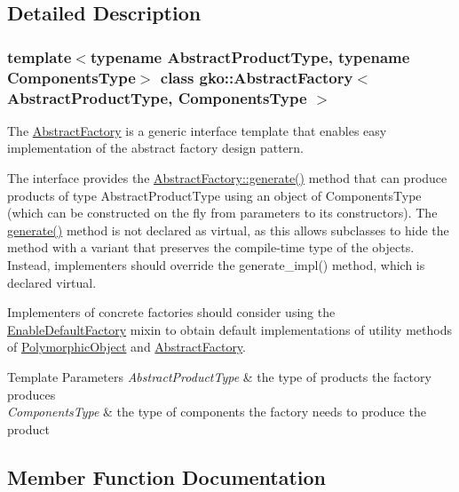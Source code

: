 \subsection{Detailed Description}
\subsubsection*{template$<$typename Abstract\+Product\+Type, typename Components\+Type$>$\newline
class gko\+::\+Abstract\+Factory$<$ Abstract\+Product\+Type, Components\+Type $>$}

The \hyperlink{classgko_1_1AbstractFactory}{Abstract\+Factory} is a generic interface template that enables easy implementation of the abstract factory design pattern. 

The interface provides the \hyperlink{classgko_1_1AbstractFactory_a159c45f1db78b6b928d69cb9adf5c9ee}{Abstract\+Factory\+::generate()} method that can produce products of type {\ttfamily Abstract\+Product\+Type} using an object of {\ttfamily Components\+Type} (which can be constructed on the fly from parameters to its constructors). The \hyperlink{classgko_1_1AbstractFactory_a159c45f1db78b6b928d69cb9adf5c9ee}{generate()} method is not declared as virtual, as this allows subclasses to hide the method with a variant that preserves the compile-\/time type of the objects. Instead, implementers should override the generate\+\_\+impl() method, which is declared virtual.

Implementers of concrete factories should consider using the \hyperlink{classgko_1_1EnableDefaultFactory}{Enable\+Default\+Factory} mixin to obtain default implementations of utility methods of \hyperlink{classgko_1_1PolymorphicObject}{Polymorphic\+Object} and \hyperlink{classgko_1_1AbstractFactory}{Abstract\+Factory}.


\begin{DoxyTemplParams}{Template Parameters}
{\em Abstract\+Product\+Type} & the type of products the factory produces \\
\hline
{\em Components\+Type} & the type of components the factory needs to produce the product \\
\hline
\end{DoxyTemplParams}


\subsection{Member Function Documentation}
\mbox{\label{classgko_1_1AbstractFactory_a159c45f1db78b6b928d69cb9adf5c9ee}} 
